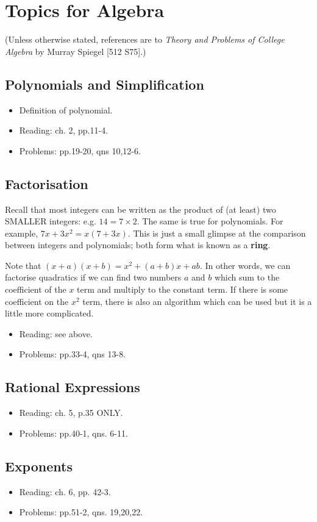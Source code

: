 \documentclass[a4paper]{amsart}
\newcommand{\df}[1]{\textbf{#1}}
\theoremstyle{definition}
\theoremstyle{remark}
\begin{document}
  \section{Topics for Algebra}
  (Unless otherwise stated, references are to \textit{Theory and Problems of College Algebra} by Murray Spiegel [512 S75].)
  \subsection{Polynomials and Simplification}
  \begin{itemize}
    \item Definition of polynomial.
    \item Reading: ch. 2, pp.11-4.
    \item Problems: pp.19-20, qns 10,12-6.
  \end{itemize}
  \subsection{Factorisation}
  Recall that most integers can be written as the product of (at least) two SMALLER integers: e.g. $ 14 = 7 \times 2 $. The same
  is true for polynomials. For example, $ 7x + 3x^2 = x(7 + 3x) $. This is just a small glimpse at the comparison between integers
  and polynomials; both form what is known as a \df{ring}.

  Note that $ (x + a)(x + b) = x^2 + (a + b)x + ab $. In other words, we can factorise quadratics if we can find two numbers $ a $ and $ b $
  which sum to the coefficient of the $ x $ term and multiply to the constant term. If there is some coefficient on the $x^2 $ term, there is
  also an algorithm which can be used but it is a little more complicated.
  \begin{itemize}
    \item Reading: see above.
    \item Problems: pp.33-4, qns 13-8.
  \end{itemize}

  \subsection{Rational Expressions}
  \begin{itemize}
    \item Reading: ch. 5, p.35 ONLY.
    \item Problems: pp.40-1, qns. 6-11.
  \end{itemize}

  \subsection{Exponents}
  \begin{itemize}
    \item Reading: ch. 6, pp. 42-3.
    \item Problems: pp.51-2, qns. 19,20,22.
  \end{itemize}
\end{document}
